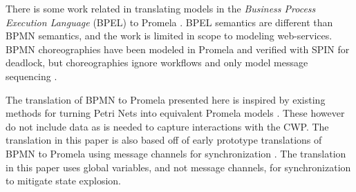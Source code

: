 There is some work related in translating models in the \emph{Business Process Execution Language} (BPEL) to Promela \cite{bpelToPromela}. BPEL semantics are different than BPMN semantics, and the work is limited in scope to modeling web-services. BPMN choreographies have been modeled in Promela and verified with SPIN for deadlock, but choreographies ignore workflows and only model message sequencing \cite{choreography}.

The translation of BPMN to Promela presented here is inspired by existing methods for turning Petri Nets into equivalent Promela models \cite{petrinetToPromela, petrinetInspiration}. These however do not include data as is needed to capture interactions with the CWP. The translation in this paper is also based off of early prototype translations of BPMN to Promela using message channels for synchronization \cite{bpmn2promela}. The translation in this paper uses global variables, and not message channels, for synchronization to mitigate state explosion.